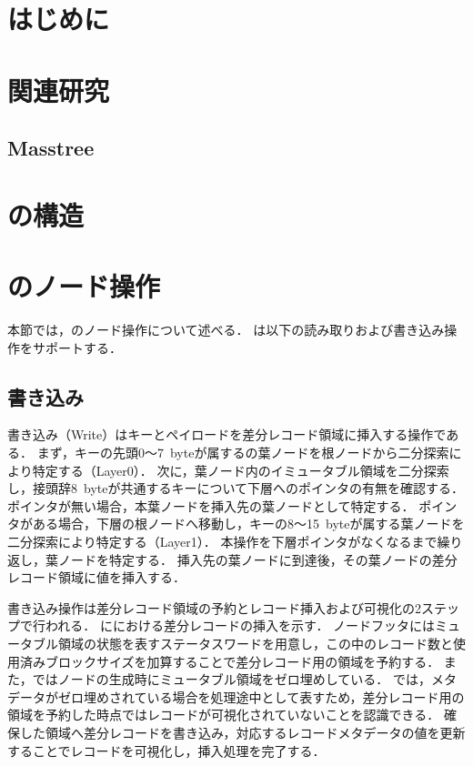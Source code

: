 
\section{はじめに}

\section{関連研究}
\label{sec:relatedwork}

\subsection{\Bctree{}}
\subsection{Masstree}

\section{\Bcforest{}の構造}
\label{sec:bc_forest_structure}

\section{\Bcforest{}のノード操作}
\label{sec:node_operation}
本節では，\Bcforest{}のノード操作について述べる．
\Bcforest{}は以下の読み取りおよび書き込み操作をサポートする．

\subsection{書き込み}
書き込み（Write）はキーとペイロードを差分レコード領域に挿入する操作である．
まず，キーの先頭0～7~byteが属するの葉ノードを根ノードから二分探索により特定する（Layer0）．
次に，葉ノード内のイミュータブル領域を二分探索し，接頭辞8~byteが共通するキーについて下層へのポインタの有無を確認する．
ポインタが無い場合，本葉ノードを挿入先の葉ノードとして特定する．
ポインタがある場合，下層の根ノードへ移動し，キーの8～15~byteが属する葉ノードを二分探索により特定する（Layer1）．
本操作を下層ポインタがなくなるまで繰り返し，葉ノードを特定する．
挿入先の葉ノードに到達後，その葉ノードの差分レコード領域に値を挿入する．

書き込み操作は差分レコード領域の予約とレコード挿入および可視化の2ステップで行われる．
\Fig{\ref{fig:bc_tree_insertion}}に\Bctree{}における差分レコードの挿入を示す．
ノードフッタにはミュータブル領域の状態を表すステータスワードを用意し，この中のレコード数と使用済みブロックサイズを加算することで差分レコード用の領域を予約する．
また，\Bctree{}ではノードの生成時にミュータブル領域をゼロ埋めしている．
\Bctree{}では，メタデータがゼロ埋めされている場合を処理途中として表すため，差分レコード用の領域を予約した時点ではレコードが可視化されていないことを認識できる．
確保した領域へ差分レコードを書き込み，対応するレコードメタデータの値を更新することでレコードを可視化し，挿入処理を完了する．

